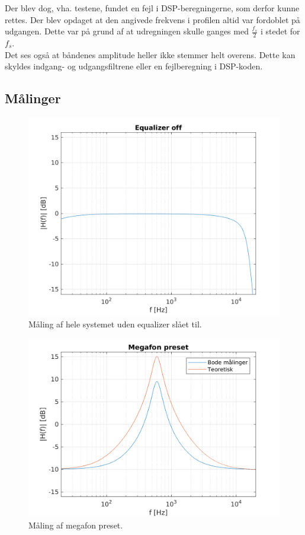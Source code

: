 Der blev dog, vha. testene, fundet en fejl i DSP-beregningerne, som derfor kunne rettes. Der blev opdaget at den angivede frekvens i profilen altid var fordoblet på udgangen. Dette var på grund af at udregningen skulle ganges med $\frac{f_s}{2}$ i stedet for $f_s$. \\ 

Det ses også at båndenes amplitude heller ikke stemmer helt overens. Dette kan skyldes indgang- og udgangsfiltrene eller en fejlberegning i DSP-koden. 





\subsection{Målinger}

\begin{figure}[h]
\centering
\includegraphics[]{matlabdemo/test/eq_off.png}  
\caption{Måling af hele systemet uden equalizer slået til.}
\end{figure}

\begin{figure}[h]
\centering
\includegraphics[]{matlabdemo/test/eq_megafon.png}
\caption{Måling af megafon preset.}
\end{figure}

